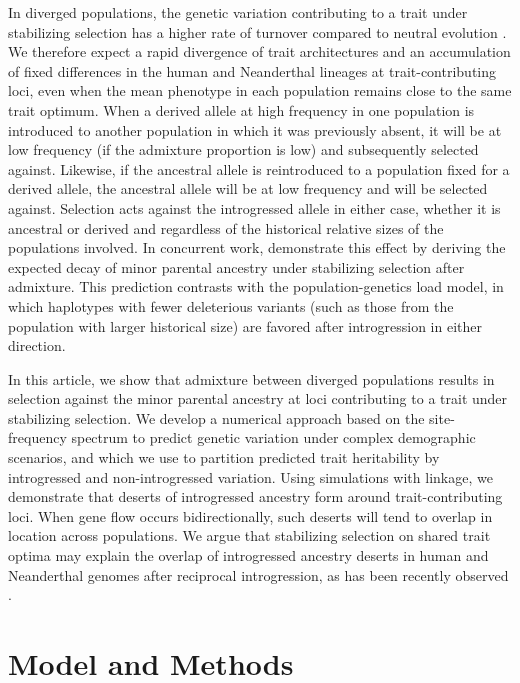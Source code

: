 \documentclass{article}
\begin{document}
In diverged populations, the genetic variation contributing to a trait under
stabilizing selection has a higher rate of turnover compared to neutral
evolution \citep{yair2022population}. We therefore expect a rapid divergence of
trait architectures and an accumulation of fixed differences in the human and
Neanderthal lineages at trait-contributing loci, even when the mean phenotype
in each population remains close to the same trait optimum. When a derived
allele at high frequency in one population is introduced to another population
in which it was previously absent, it will be at low frequency (if the
admixture proportion is low) and subsequently selected against. Likewise, if
the ancestral allele is reintroduced to a population fixed for a derived
allele, the ancestral allele will be at low frequency and will be selected
against. Selection acts against the introgressed allele in either case, whether
it is ancestral or derived and regardless of the historical relative sizes of
the populations involved. In concurrent work, \citet{veller2024stabilizing}
demonstrate this effect by deriving the expected decay of minor parental
ancestry under stabilizing selection after admixture. This prediction contrasts
with the population-genetics load model, in which haplotypes with fewer
deleterious variants (such as those from the population with larger historical
size) are favored after introgression in either direction.

In this article, we show that admixture between diverged populations results in
selection against the minor parental ancestry at loci contributing to a trait
under stabilizing selection. We develop a numerical approach based on the
site-frequency spectrum to predict genetic variation under complex demographic
scenarios, and which we use to partition predicted trait heritability by
introgressed and non-introgressed variation. Using simulations with linkage, we
demonstrate that deserts of introgressed ancestry form around
trait-contributing loci. When gene flow occurs bidirectionally, such deserts
will tend to overlap in location across populations. We argue that stabilizing
selection on shared trait optima may explain the overlap of introgressed
ancestry deserts in human and Neanderthal genomes after reciprocal
introgression, as has been recently observed \citep{harris2023diverse}.

\section*{Model and Methods}
\end{document}
